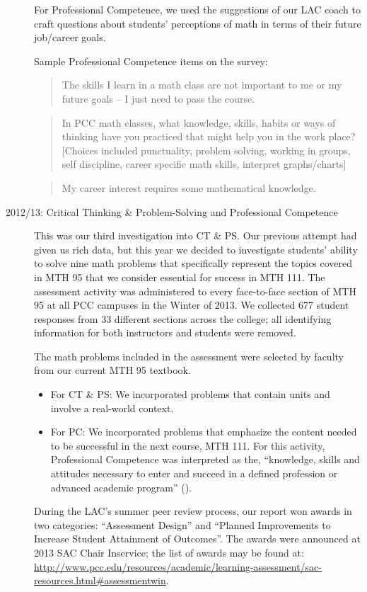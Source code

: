 \begin{description}
For Professional Competence, we used the suggestions of our LAC coach to craft questions about students' perceptions of math in terms of their future job/career goals. 

Sample Professional Competence items on the survey:
\begin{quote}
The skills I learn in a math class are not important to me or my future goals -- I just need to pass the course.
\end{quote}
\begin{quote}
In PCC math classes, what knowledge, skills, habits or ways of thinking have you practiced that might help you in the work place? [Choices included punctuality, problem solving, working in groups, self discipline, career specific math skills, interpret graphs/charts]
\end{quote}
\begin{quote}
My career interest requires some mathematical knowledge.
\end{quote}

\item[2012/13:  Critical Thinking \& Problem-Solving and Professional Competence]

This was our third investigation into CT \& PS.  Our previous attempt had given us rich data, but this year we decided to investigate students' ability to solve nine math problems that specifically represent the topics covered in MTH 95 that we consider essential for success in MTH 111.  The assessment activity was administered to every face-to-face section of MTH 95 at all PCC campuses in the Winter of 2013.  We collected 677 student responses from 33 different sections across the college; all identifying information for both instructors and students were removed.

The math problems included in the assessment were selected by faculty from our current MTH 95 textbook.
\begin{itemize}
\item For CT \& PS: We incorporated problems that contain units and involve a real-world context.
\item For PC:  We incorporated problems that emphasize the content needed to be successful in the next course, MTH 111.  For this activity, Professional Competence was interpreted as the, ``knowledge, skills and attitudes necessary to enter and succeed in a defined profession or advanced academic program'' (\cite{coreoutcomes}).
\end{itemize}
During the LAC's summer peer review process, our report won awards in two categories: ``Assessment Design'' and ``Planned Improvements to Increase Student Attainment of Outcomes''.  The awards were announced at 2013 SAC Chair Inservice; the list of awards may be found at: \url{http://www.pcc.edu/resources/academic/learning-assessment/sac-resources.html#assessmentwin}.

\end{description}

